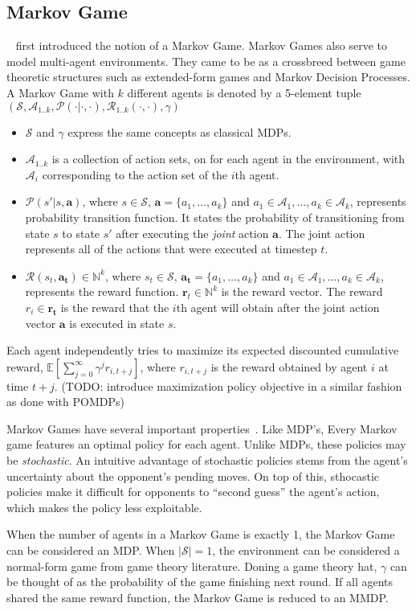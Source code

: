 \documentclass{../main.tex}{}
\begin{document}
\subsection{Markov Game}

~\cite{Owen1982} first introduced the notion of a Markov Game. Markov Games also serve to model multi-agent environments. They came to be as a crossbreed between game theoretic structures such as extended-form games and Markov Decision Processes. 
A Markov Game with $k$ different agents is denoted by a 5-element tuple $(\mathcal{S}, {\mathcal{A}_{1..k}}, \mathcal{P}(\cdot | \cdot, \cdot), {\mathcal{R}_{1..k}(\cdot, \cdot)}, \gamma)$
\begin{itemize}
    \item $\mathcal{S}$ and $\gamma$ express the same concepts as classical MDPs.
    \item $\mathcal{A}_{1..k}$ is a collection of action sets, on for each agent in the environment, with $\mathcal{A}_i$ corresponding to the action set of the $i$th agent.
    \item $\mathcal{P}(s' | s, \mathbf{a})$, where $s \in \mathcal{S}$, $\mathbf{a} = \{a_1,\ldots,a_k\}$ and $a_1 \in \mathcal{A}_1, \ldots, a_k \in \mathcal{A}_k$, represents probability transition function. It states the probability of transitioning from state $s$ to state $s'$ after executing the \textit{joint} action $\mathbf{a}$. The joint action represents all of the actions that were executed at timestep $t$.
    \item $\mathcal{R}(s_t, \mathbf{a_t}) \in \mathbb{N}^k$, where $s_t \in \mathcal{S}$, $\mathbf{a_t} = \{a_1,\ldots,a_k\}$ and $a_1 \in \mathcal{A}_1, \ldots, a_k \in \mathcal{A}_k$, represents the reward function. $\boldsymbol{r}_t \in \mathbb{N}^k$ is the reward vector. The reward $r_i \in \boldsymbol{r_t}$ is the reward that the $i$th agent will obtain after the joint action vector $\mathbf{a}$ is executed in state $s$.
\end{itemize}

Each agent independently tries to maximize its expected discounted cumulative reward, $\mathbb{E}[\sum_{j=0}^{\infty} \gamma^{j} r_{i,t+j}]$, where $r_{i, t+j}$ is the reward obtained by agent $i$ at time $t+j$. (TODO: introduce maximization policy objective in a similar fashion as done with POMDPs)

Markov Games have several important properties~\cite{Owen1982, Littman1994}. Like MDP's, Every Markov game features an optimal policy for each agent. Unlike MDPs, these policies may be \textit{stochastic}. An intuitive advantage of stochastic policies stems from the agent's uncertainty about the opponent's pending moves. On top of this, sthocastic policies make it difficult for opponents to ``second guess'' the agent's action, which makes the policy less exploitable. 

When the number of agents in a Markov Game is exactly 1, the Markov Game can be considered an MDP\@. When $|\mathcal{S}| = 1$, the environment can be considered a normal-form game from game theory literature. Doning a game theory hat, $\gamma$ can be thought of as the probability of the game finishing next round. If all agents shared the same reward function, the Markov Game is reduced to an MMDP\@.
\end{document}
